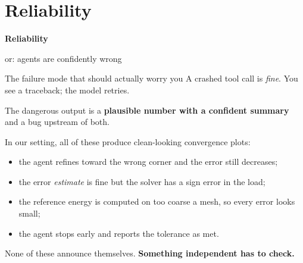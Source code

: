 \documentclass[aspectratio=169,10pt]{beamer}
\newcommand{\hl}[1]{\textcolor{accent}{\textbf{#1}}}
\begin{document}
\section{Reliability}

\begin{frame}[plain]
\begin{center}
\Huge\bfseries Reliability
\vspace{0.8em}

\large\mdseries or: agents are confidently wrong
\end{center}
\end{frame}

\begin{frame}{The failure mode that should actually worry you}
A crashed tool call is \emph{fine}. You see a traceback; the model retries.

\vspace{1em}
\begin{center}\large
The dangerous output is a \hl{plausible number with a confident summary}
and a bug upstream of both.
\end{center}

\vspace{1em}
In our setting, all of these produce clean-looking convergence plots:
\begin{itemize}\itemsep3pt
  \item the agent refines toward the wrong corner and the error still decreases;
  \item the error \emph{estimate} is fine but the solver has a sign error in the load;
  \item the reference energy is computed on too coarse a mesh, so every error looks small;
  \item the agent stops early and reports the tolerance as met.
\end{itemize}

\vspace{1em}
None of these announce themselves. \hl{Something independent has to check.}
\end{frame}
\end{document}
